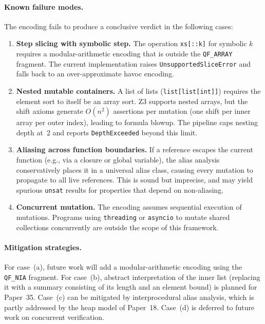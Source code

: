 \documentclass[11pt]{article}
\newcommand{\QFARRAY}{\texttt{QF\_ARRAY}}
\begin{document}
\paragraph{Known failure modes.}
The encoding fails to produce a conclusive verdict in the following cases:

\begin{enumerate}[label=(\alph*),nosep]
  \item \textbf{Step slicing with symbolic step.}  The operation
        \texttt{xs[::k]} for symbolic $k$ requires a modular-arithmetic
        encoding that is outside the \QFARRAY{} fragment.  The current
        implementation raises \texttt{UnsupportedSliceError} and falls
        back to an over-approximate havoc encoding.
  \item \textbf{Nested mutable containers.}  A list of lists
        (\texttt{list[list[int]]}) requires the element sort to itself
        be an array sort.  Z3 supports nested arrays, but the shift
        axioms generate $O(n^2)$ assertions per mutation (one shift per
        inner array per outer index), leading to formula blowup.
        The pipeline caps nesting depth at~2 and reports
        \texttt{DepthExceeded} beyond this limit.
  \item \textbf{Aliasing across function boundaries.}  If a reference
        escapes the current function (e.g., via a closure or global
        variable), the alias analysis conservatively places it in a
        universal alias class, causing every mutation to propagate
        to all live references.  This is sound but imprecise, and
        may yield spurious \texttt{unsat} results for properties that
        depend on non-aliasing.
  \item \textbf{Concurrent mutation.}  The encoding assumes sequential
        execution of mutations.  Programs using \texttt{threading} or
        \texttt{asyncio} to mutate shared collections concurrently are
        outside the scope of this framework.
\end{enumerate}

\paragraph{Mitigation strategies.}
For case~(a), future work will add a modular-arithmetic encoding using the
\texttt{QF\_NIA} fragment.  For case~(b), abstract interpretation of the
inner list (replacing it with a summary consisting of its length and an
element bound) is planned for Paper~35.  Case~(c) can be mitigated by
interprocedural alias analysis, which is partly addressed by the heap model
of Paper~18.  Case~(d) is deferred to future work on concurrent verification.
\end{document}
